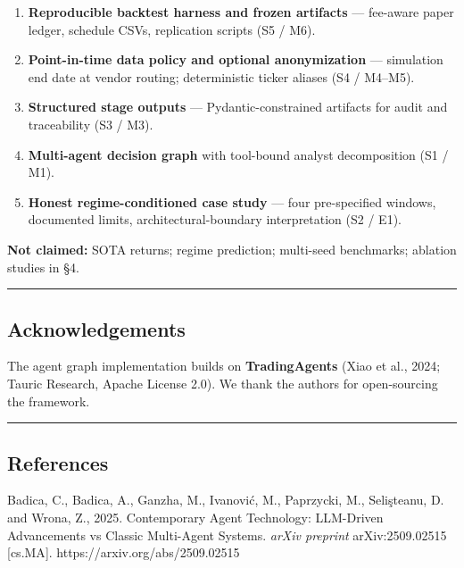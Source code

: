 \documentclass[
]{article}
\providecommand{\tightlist}{%
  \setlength{\itemsep}{0pt}\setlength{\parskip}{0pt}}
\begin{document}
\begin{enumerate}
\def\labelenumi{\arabic{enumi}.}
\tightlist
\item
  \textbf{Reproducible backtest harness and frozen artifacts} ---
  fee-aware paper ledger, schedule CSVs, replication scripts (S5 /
  M6).\\
\item
  \textbf{Point-in-time data policy and optional anonymization} ---
  simulation end date at vendor routing; deterministic ticker aliases
  (S4 / M4--M5).\\
\item
  \textbf{Structured stage outputs} --- Pydantic-constrained artifacts
  for audit and traceability (S3 / M3).\\
\item
  \textbf{Multi-agent decision graph} with tool-bound analyst
  decomposition (S1 / M1).\\
\item
  \textbf{Honest regime-conditioned case study} --- four pre-specified
  windows, documented limits, architectural-boundary interpretation (S2
  / E1).
\end{enumerate}

\textbf{Not claimed:} SOTA returns; regime prediction; multi-seed
benchmarks; ablation studies in §4.

\begin{center}\rule{0.5\linewidth}{0.5pt}\end{center}

\subsection{Acknowledgements}\label{acknowledgements}

The agent graph implementation builds on \textbf{TradingAgents} (Xiao et
al., 2024; Tauric Research, Apache License 2.0). We thank the authors
for open-sourcing the framework.

\begin{center}\rule{0.5\linewidth}{0.5pt}\end{center}

\subsection{References}\label{references}

Badica, C., Badica, A., Ganzha, M., Ivanović, M., Paprzycki, M.,
Selişteanu, D. and Wrona, Z., 2025. Contemporary Agent Technology:
LLM-Driven Advancements vs Classic Multi-Agent Systems. \emph{arXiv
preprint} arXiv:2509.02515 {[}cs.MA{]}. https://arxiv.org/abs/2509.02515
\end{document}
